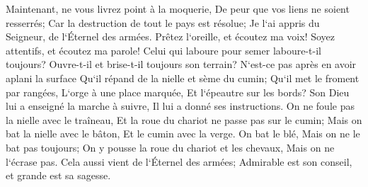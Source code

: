 \verse Maintenant, ne vous livrez point à la moquerie, De peur que vos liens ne soient resserrés; Car la destruction de tout le pays est résolue; Je l`ai appris du Seigneur, de l`Éternel des armées. 
\verse Prêtez l`oreille, et écoutez ma voix! Soyez attentifs, et écoutez ma parole! 
\verse Celui qui laboure pour semer laboure-t-il toujours? Ouvre-t-il et brise-t-il toujours son terrain? 
\verse N`est-ce pas après en avoir aplani la surface Qu`il répand de la nielle et sème du cumin; Qu`il met le froment par rangées, L`orge à une place marquée, Et l`épeautre sur les bords? 
\verse Son Dieu lui a enseigné la marche à suivre, Il lui a donné ses instructions. 
\verse On ne foule pas la nielle avec le traîneau, Et la roue du chariot ne passe pas sur le cumin; Mais on bat la nielle avec le bâton, Et le cumin avec la verge. 
\verse On bat le blé, Mais on ne le bat pas toujours; On y pousse la roue du chariot et les chevaux, Mais on ne l`écrase pas. 
\verse Cela aussi vient de l`Éternel des armées; Admirable est son conseil, et grande est sa sagesse. 

\chapter{}

